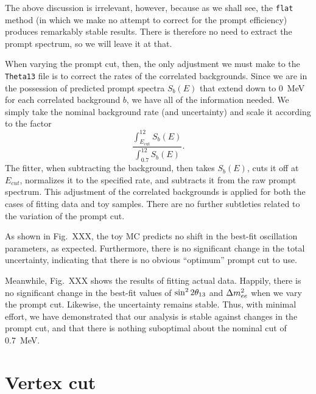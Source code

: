 \documentclass[../thesis.tex]{subfiles}
\begin{document}
The above discussion is irrelevant, however, because as we shall see, the \texttt{flat} method (in which we make no attempt to correct for the prompt efficiency) produces remarkably stable results. There is therefore no need to extract the prompt spectrum, so we will leave it at that.

When varying the prompt cut, then, the only adjustment we must make to the \texttt{Theta13} file is to correct the rates of the correlated backgrounds. Since we are in the possession of predicted prompt spectra $S_b(E)$ that extend down to 0~MeV for each correlated background $b$, we have all of the information needed. We simply take the nominal background rate (and uncertainty) and scale it according to the factor
\[
  \frac{\int_{E_{\mathrm{cut}}}^{12} S_b(E)}{\int_{0.7}^{12} S_b(E)}.
\]
The fitter, when subtracting the background, then takes $S_b(E)$, cuts it off at $E_{cut}$, normalizes it to the specified rate, and subtracts it from the raw prompt spectrum. This adjustment of the correlated backgrounds is applied for both the cases of fitting data and toy samples. There are no further subtleties related to the variation of the prompt cut.

As shown in Fig.~XXX, the toy MC predicts no shift in the best-fit oscillation parameters, as expected. Furthermore, there is no significant change in the total uncertainty, indicating that there is no obvious ``optimum'' prompt cut to use.

Meanwhile, Fig.~XXX shows the results of fitting actual data. Happily, there is no significant change in the best-fit values of $\sin^2 2\theta_{13}$ and $\Delta m^2_{ee}$ when we vary the prompt cut. Likewise, the uncertainty remains stable. Thus, with minimal effort, we have demonstrated that our analysis is stable against changes in the prompt cut, and that there is nothing suboptimal about the nominal cut of 0.7~MeV.

\section{Vertex cut}
\label{sec:cutVaryVertexCut}

\begin{comment}
  XXX Do our adjustments of background rates account for the fact that some backgrounds can occur in the GdLS+LS whereas others occur only in GdLS?

Accidentals -- Handled automatically, no adjustment, we're good
Li9, fast-n, alpha-n: Only in GdLS, ???
AmC: Both. R distribution unknown but probably ``lumpy''. Z probably like what we did.
\end{comment}
\end{document}
